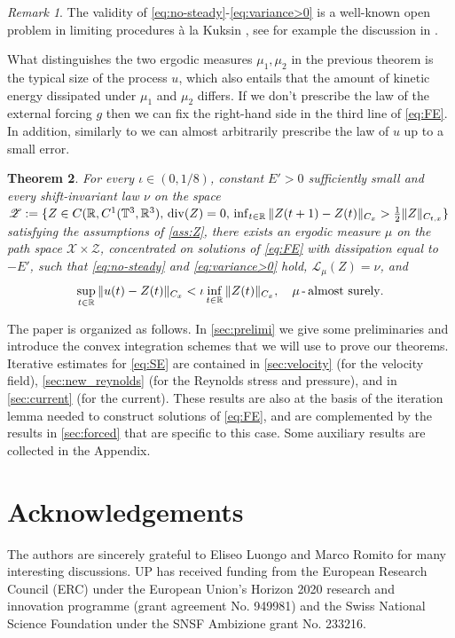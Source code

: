\documentclass[10pt,a4paper]{amsart}
\numberwithin{equation}{section}
\newtheorem{thm}{Theorem}[section]
\numberwithin{corollario}{section}
\numberwithin{lemma}{section}
\numberwithin{prop}{section}
\theoremstyle{definition}
\theoremstyle{remark}
\newtheorem{oss}[thm]{Remark}
\newcommand{\R}{\mathbb{R}}
\newcommand{\T}{\mathbb{T}}
\newcommand{\dvg}{\mathord{{\rm div}}}
\begin{document}
\begin{oss}
The validity of \eqref{eq:no-steady}-\eqref{eq:variance>0} is a well-known open problem in limiting procedures à la Kuksin \cite{Ku04}, see for example the discussion in \cite[Section 2.3]{BeCZGH16}.
\end{oss}


What distinguishes the two ergodic measures $\mu_1,\mu_2$ in the previous theorem is the typical size of the process $u$, which also entails that the amount of kinetic energy dissipated under $\mu_1$ and $\mu_2$ differs. 
If we don't prescribe the law of the external forcing $g$ then we can fix the right-hand side in the third line of \eqref{eq:FE}. In addition, similarly to \cite[Theorems 6.1 - 6.3]{HoZhZh25} we can almost arbitrarily prescribe the law of $u$ up to a small error.  
\begin{thm} \label{thm:main3}
For every $\iota \in (0,1/8)$, constant $E' >0$ sufficiently small and every shift-invariant law $\nu$ on the space $\mathscr{Z} := \{Z \in C(\R,C^1(\T^3,\R^3), \, \dvg(Z)=0, \, \inf_{t \in \R}\|Z(t+1) - Z(t)\|_{C_x} > \frac12  \|Z\|_{C_{t,x}} \}$ satisfying the assumptions of \autoref{ass:Z}, there exists an ergodic measure ${\mu}$ on the path space $\mathscr{X} \times \mathscr{Z}$, concentrated on solutions of \eqref{eq:FE} with dissipation equal to $-E'$, such that \eqref{eq:no-steady} and \eqref{eq:variance>0} hold, $\mathscr{L}_\mu(Z) = \nu$, and
\begin{align}
\sup_{t \in \R} \| u(t) - Z(t) \|_{C_x} < \iota \inf_{t \in \R} \| Z(t) \|_{C_x},
\quad
\mu\,\mbox{-\,almost surely}.
\end{align}
\end{thm}

The paper is organized as follows.
In \autoref{sec:prelimi} we give some preliminaries and introduce the convex integration schemes that we will use to prove our theorems.
Iterative estimates for \eqref{eq:SE} are contained in \autoref{sec:velocity} (for the velocity field),
\autoref{sec:new_reynolds} (for the Reynolds stress and pressure), and in 
\autoref{sec:current} (for the current).
These results are also at the basis of the iteration lemma needed to construct solutions of \eqref{eq:FE}, and are complemented by the results in \autoref{sec:forced} that are specific to this case.
Some auxiliary results are collected in the Appendix.




\section*{Acknowledgements}
 The authors are sincerely grateful to Eliseo Luongo and Marco Romito for many interesting discussions.
UP has received funding from the European Research Council (ERC) under the European Union’s Horizon 2020 research and innovation programme (grant agreement No. 949981) and the Swiss National Science Foundation under the SNSF Ambizione grant No. 233216.
\end{document}
